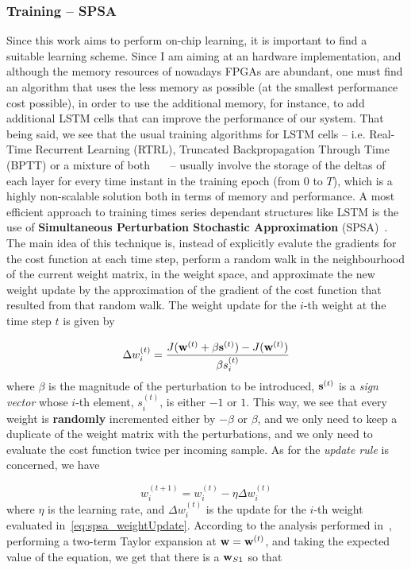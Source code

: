 \subsubsection{Training -- SPSA}\label{sec:training_lstm}
Since this work aims to perform on-chip learning, it is important to find a suitable learning scheme. Since I am aiming at an hardware implementation, and although the memory resources of nowadays FPGAs are abundant, one must find an algorithm that uses the less memory as possible (at the smallest performance cost possible), in order to use the additional memory, for instance, to add additional LSTM cells that can improve the performance of our system. 
That being said, we see that the usual training algorithms for LSTM cells -- i.e. Real-Time Recurrent Learning (RTRL), Truncated Backpropagation Through Time (BPTT) or a mixture of both~\cite{Graves05}~\cite{Hoch97}~\cite{Greff15} -- usually involve the storage of the deltas of each layer for every time instant in the training epoch (from $0$ to $T$), which is a highly non-scalable solution both in terms of memory and performance. A most efficient approach to training times series dependant structures like LSTM is the use of \textbf{Simultaneous Perturbation Stochastic Approximation} (SPSA)~\cite{Spall98}.  The main idea of this technique is, instead of explicitly evalute the gradients for the cost function at each time step, perform a random walk in the neighbourhood of the current weight matrix, in the weight space, and approximate the new weight update by the approximation of the gradient of the cost function that resulted from that random walk. The weight update for the $i$-th weight at the time step $t$ is given by 

\begin{equation}\label{eq:spsa_weightUpdate}
    \Delta w_i^{(t)} = \frac{J(\mathbf{w}^{(t)} + \beta \mathbf{s}^{(t)}) - J(\mathbf{w}^{(t)})}{\beta s_i^{(t)}}
\end{equation}
where $\beta$ is the magnitude of the perturbation to be introduced, $\mathbf{s}^{(t)}$ is a \textit{sign vector} whose $i$-th element, $s_i^{(t)}$, is either $-1$ or $1$. This way, we see that every weight is \textbf{randomly} incremented either by $-\beta$ or $\beta$, and we only need to keep a duplicate of the weight matrix with the perturbations, and we only need to evaluate the cost function twice per incoming sample. As for the \textit{update rule} is concerned, we have 

\begin{equation}\label{eq:spsa_updateRule}
    w_i^{(t+1)} = w_i^{(t)} - \eta \Delta w_i^{(t)}
\end{equation}
where $\eta$ is the learning rate, and $\Delta w_i^{(t)}$ is the update for the $i$-th weight evaluated in~\ref{eq:spsa_weightUpdate}.
According to the analysis performed in~\cite{Maeda05}, performing a two-term Taylor expansion at $\mathbf{w} = \mathbf{w}^{(t)}$, and taking the expected value of the equation, we get that there is a $\mathbf{w}_{S1}$ so that

